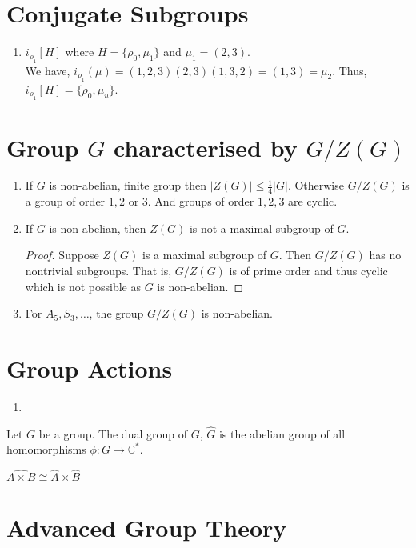 \section{Conjugate Subgroups}
\begin{enumerate}
	\item $i_{\rho_1}[H]$ where $H = \{ \rho_0, \mu_1 \}$ and $\mu_1 = (2,3)$.\\
	We have, $i_{\rho_1}(\mu) = (1,2,3)(2,3)(1,3,2)=(1,3) = \mu_2$.
	Thus, $i_{\rho_1}[H] = \{ \rho_0, \mu_u \}$.
\end{enumerate}

\section{Group $G$ characterised by $G/Z(G)$}
\begin{enumerate}
	\item If $G$ is non-abelian, finite group then $|Z(G)| \le \frac{1}{4}|G|$. Otherwise $G/Z(G)$ is a group of order $1,2$ or $3$. And groups of order $1,2,3$ are cyclic.
	\item If $G$ is non-abelian, then $Z(G)$ is not a maximal subgroup of $G$.
	\begin{proof}
		Suppose $Z(G)$ is a maximal subgroup of $G$.
		Then $G/Z(G)$ has no nontrivial subgroups.
		That is, $G/Z(G)$ is of prime order and thus cyclic which is not possible as $G$ is non-abelian.
	\end{proof}
	\item For $A_5,S_3,\dots$, the group $G/Z(G)$ is non-abelian.
\end{enumerate}

\section{Group Actions}
\begin{enumerate}
	\item 
\end{enumerate}

\begin{definition}
	Let $G$ be a group. The dual group of $G$, $\hat{G}$ is the abelian group of all homomorphisms $\phi : G \to \mathbb{C}^\ast$.
\end{definition}
	$\widehat{A \times B} \cong \hat{A} \times \hat{B}$

\section{Advanced Group Theory}
